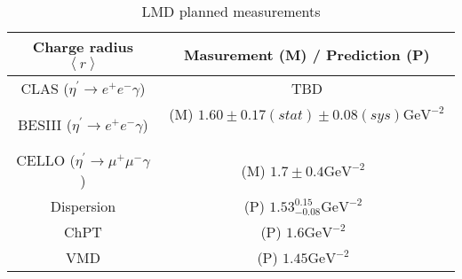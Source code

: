 \begin{table}[h!]
\begin{minipage}{\textwidth}
\begin{center}


\caption{\label{tab:etaP.models}LMD planned measurements \vspace{0.75mm}}
\begin{tabular}{cc}
\hline
Charge radius $\left< r\right>$ & Masurement (M) / Prediction (P) \\
\hline
CLAS ($\eta^{\prime}\to e^+e^-\gamma$)   & TBD \\
BESIII ($\eta^{\prime}\to e^+e^-\gamma$)   & (M) $1.60\pm0.17(stat)\pm0.08(sys) \mathrm{GeV}^{-2}$~\cite{bib7} \\
CELLO ($\eta^{\prime}\to \mu^+\mu^-\gamma$)   & (M)  $1.7\pm0.4 \mathrm{GeV}^{-2}$~\cite{bib9}  \\
Dispersion    & (P)  $1.53^{0.15}_{-0.08} \mathrm{GeV}^{-2}$~\cite{bib12}  \\
ChPT    & (P) $1.6 \mathrm{GeV}^{-2}$~\cite{bib11}  \\
VMD    & (P) $1.45  \mathrm{GeV}^{-2}$~\cite{bib10}  \\
\hline 
\end{tabular}


\end{center}
\end{minipage}
\end{table}
\vspace{20pt}